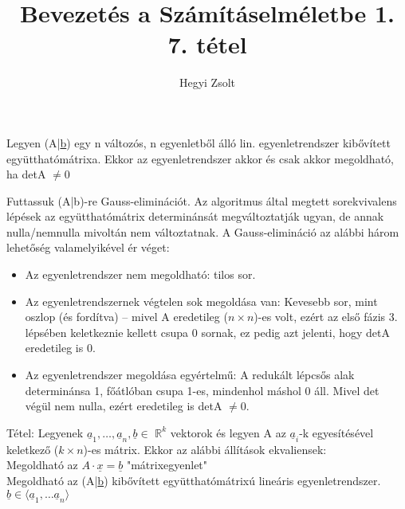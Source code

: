 \documentclass[]{article}
\title{Bevezetés a Számításelméletbe 1.\\{\large 7. tétel}}
\author{Hegyi Zsolt}
\newcommand{\Rn}[1]{$\mathbb{R}^{#1}$}
\newcommand{\Und}[1]{\underline{#1}}
\begin{document}
\maketitle{}
\begin{framed}
Legyen (A|\Und{b}) egy n változós, n egyenletből álló lin. egyenletrendszer kibővített együtthatómátrixa. Ekkor az egyenletrendszer akkor és csak akkor megoldható, ha detA $\neq 0$
\end{framed}
\begin{leftbar}
Futtassuk (A|b)-re Gauss-eliminációt. Az algoritmus által megtett sorekvivalens lépések az együtthatómátrix determinánsát megváltoztatják ugyan, de annak nulla/nemnulla mivoltán nem változtatnak. A Gauss-elimináció az alábbi három lehetőség valamelyikével ér véget:\\
\begin{itemize}
\item Az egyenletrendszer nem megoldható: tilos sor.
\item Az egyenletrendszernek végtelen sok megoldása van:
Kevesebb sor, mint oszlop (és fordítva) -- mivel A eredetileg ($n \times n$)-es volt, ezért az első fázis 3. lépsében keletkeznie kellett csupa 0 sornak, ez pedig azt jelenti, hogy detA eredetileg is 0.
\item Az egyenletrendszer megoldása egyértelmű: A redukált lépcsős alak determinánsa 1, főátlóban csupa 1-es, mindenhol máshol 0 áll. Mivel det végül nem nulla, ezért eredetileg is detA $\neq 0$.
\end{itemize}
\end{leftbar}
\begin{framed}
Tétel: Legyenek $\Und{a}_1, \ldots, \Und{a}_n, \Und{b} \in$ \Rn{k} vektorok és legyen A az $\Und{a}_i$-k egyesítésével keletkező ($k \times n$)-es mátrix. Ekkor az alábbi állítások ekvaliensek:\\
Megoldható az $A \cdot \Und{x} = \Und{b}$ "mátrixegyenlet"\\
Megoldható az (A|\Und{b}) kibővített együtthatómátrixú lineáris egyenletrendszer.\\
$\Und{b} \in \langle \Und{a}_1, \ldots \Und{a}_n \rangle$
\end{framed}
\end{document}
